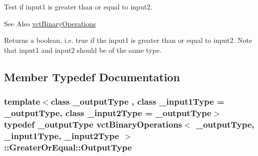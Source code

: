 Test if input1 is greater than or equal to input2. 

\begin{DoxySeeAlso}{See Also}
\hyperlink{classvct_binary_operations}{vct\-Binary\-Operations}
\end{DoxySeeAlso}
Returns a boolean, i.\-e. true if the input1 is greater than or equal to input2. Note that input1 and input2 should be of the same type. 

\subsection{Member Typedef Documentation}
\hypertarget{classvct_binary_operations_1_1_greater_or_equal_aeb46d29e2a560982db8181d297538b4b}{
\subsubsection[{Output\-Type}]{\setlength{\rightskip}{0pt plus 5cm}template$<$class \-\_\-output\-Type , class \-\_\-input1\-Type  = \-\_\-output\-Type, class \-\_\-input2\-Type  = \-\_\-output\-Type$>$ typedef \-\_\-output\-Type {\bf vct\-Binary\-Operations}$<$ \-\_\-output\-Type, \-\_\-input1\-Type, \-\_\-input2\-Type $>$\-::{\bf Greater\-Or\-Equal\-::\-Output\-Type}}}\label{classvct_binary_operations_1_1_greater_or_equal_aeb46d29e2a560982db8181d297538b4b}


